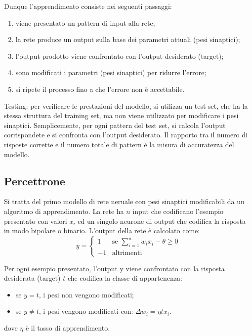 Dunque l'apprendimento consiste nei seguenti passaggi:
\begin{enumerate}
	\item viene presentato un pattern di input alla rete;
	\item la rete produce un output sulla base dei parametri attuali (pesi
	sinaptici);
	\item l'output prodotto viene confrontato con l'output desiderato (target);
	\item sono modificati i parametri (pesi sinaptici) per ridurre l'errore;
	\item si ripete il processo fino a che l'errore non è accettabile.
\end{enumerate}

Testing: per verificare le prestazioni del modello, si utilizza un test set, che
ha la stessa struttura del training set, ma non viene utilizzato per modificare
i pesi sinaptici. Semplicemente, per ogni pattern del test set, si calcola
l'output corrispondete e si confronta con l'output desiderato. Il rapporto tra
il numero di risposte corrette e il numero totale di pattern è la misura di
accuratezza del modello.

\subsection{Percettrone}

Si tratta del primo modello di rete neruale con pesi sinaptici modificabili da
un algoritmo di apprendimento. La rete ha $n$ input che codificano l'esempio
presentato con valori $x_i$ ed un singolo neurone di output che codifica la
risposta in modo bipolare o binario. L'output della rete è calcolato come:
\begin{equation}
	y = \begin{cases}
		1 & \text{se } \sum_{i=1}^{n} w_i x_i - \theta \geq 0 \\
		-1 & \text{altrimenti}
	\end{cases}
\end{equation}

Per ogni esempio presentato, l'output y viene confrontato con la risposta
desiderata (target) $t$ che codifica la classe di appartenenza:
\begin{itemize}
\item se $y = t$, i pesi non vengono modificati;
\item se $y \neq t$, i pesi vengono modificati con: $\Delta w_i = \eta t x_i$.
\end{itemize}
dove $\eta$ è il tasso di apprendimento.

